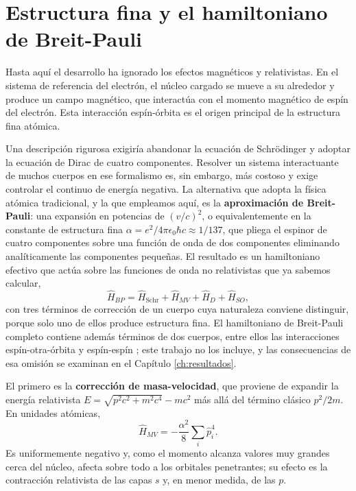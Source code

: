 \section{Estructura fina y el hamiltoniano de Breit-Pauli}
\label{sec:spin_orbita}

Hasta aquí el desarrollo ha ignorado los efectos magnéticos y relativistas. En el sistema de referencia del electrón, el núcleo cargado se mueve a su alrededor y produce un campo magnético, que interactúa con el momento magnético de espín del electrón. Esta interacción espín-órbita es el origen principal de la estructura fina atómica.

Una descripción rigurosa exigiría abandonar la ecuación de Schrödinger y adoptar la ecuación de Dirac de cuatro componentes. Resolver un sistema interactuante de muchos cuerpos en ese formalismo es, sin embargo, más costoso y exige controlar el continuo de energía negativa. La alternativa que adopta la física atómica tradicional, y la que empleamos aquí, es la \textbf{aproximación de Breit-Pauli}: una expansión en potencias de $(v/c)^2$, o equivalentemente en la constante de estructura fina $\alpha = e^2/4\pi\epsilon_0\hbar c \approx 1/137$, que pliega el espinor de cuatro componentes sobre una función de onda de dos componentes eliminando analíticamente las componentes pequeñas. El resultado es un hamiltoniano efectivo que actúa sobre las funciones de onda no relativistas que ya sabemos calcular,
\begin{equation}
    \label{eq:breit_pauli}
    \hat{H}_{BP} = \hat{H}_{\text{Schr}} + \hat{H}_{MV} + \hat{H}_{D} + \hat{H}_{SO},
\end{equation}
con tres términos de corrección de un cuerpo \parencite[Sección 3-7]{Cowan1981} cuya naturaleza conviene distinguir, porque solo uno de ellos produce estructura fina. El hamiltoniano de Breit-Pauli completo contiene además términos de dos cuerpos, entre ellos las interacciones espín-otra-órbita y espín-espín \parencite{Cowan1981}; este trabajo no los incluye, y las consecuencias de esa omisión se examinan en el Capítulo \ref{ch:resultados}.

El primero es la \textbf{corrección de masa-velocidad}, que proviene de expandir la energía relativista $E = \sqrt{p^2c^2 + m^2c^4} - mc^2$ más allá del término clásico $p^2/2m$. En unidades atómicas,
\begin{equation}
    \label{eq:h_mv}
    \hat{H}_{MV} = -\frac{\alpha^2}{8}\sum_i \hat{p}_i^4 .
\end{equation}
Es uniformemente negativo y, como el momento alcanza valores muy grandes cerca del núcleo, afecta sobre todo a los orbitales penetrantes; su efecto es la contracción relativista de las capas $s$ y, en menor medida, de las $p$.

